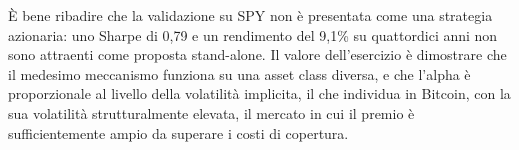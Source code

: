È bene ribadire che la validazione su SPY non è presentata come una strategia
azionaria: uno Sharpe di 0,79 e un rendimento del 9,1\% su quattordici anni
non sono attraenti come proposta stand-alone. Il valore dell'esercizio è
dimostrare che il medesimo meccanismo funziona su una asset class diversa, e
che l'alpha è proporzionale al livello della volatilità implicita, il che
individua in Bitcoin, con la sua volatilità strutturalmente elevata, il
mercato in cui il premio è sufficientemente ampio da superare i costi di
copertura.
